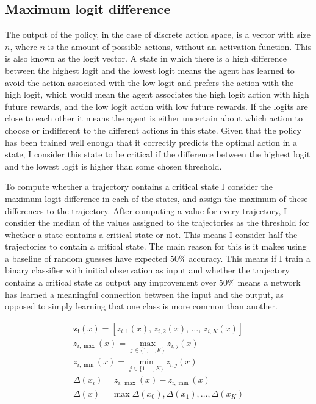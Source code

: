 \documentclass[UKenglish]{uiomasterthesis}
\begin{document}
\subsection{Maximum logit difference}
\label{sec:mld}
The output of the policy, in the case of discrete action space, is a vector with size $n$, where $n$ is the amount of possible actions, without an activation function. This is also known as the logit vector. A state in which there is a high difference between the highest logit and the lowest logit means the agent has learned to avoid the action associated with the low logit and prefers the action with the high logit, which would mean the agent associates the high logit action with high future rewards, and the low logit action with low future rewards. If the logits are close to each other it means the agent is either uncertain about which action to choose or indifferent to the different actions in this state. Given that the policy has been trained well enough that it correctly predicts the optimal action in a state, I consider this state to be critical if the difference between the highest logit and the lowest logit is higher than some chosen threshold.

To compute whether a trajectory contains a critical state I consider the maximum logit difference in each of the states, and assign the maximum of these differences to the trajectory. After computing a value for every trajectory, I consider the median of the values assigned to the trajectories as the threshold for whether a state contains a critical state or not. This means I consider half the trajectories to contain a critical state. The main reason for this is it makes using a baseline of random guesses have expected $50\%$ accuracy. This means if I train a binary classifier with initial observation as input and whether the trajectory contains a critical state as output any improvement over $50\%$ means a network has learned a meaningful connection between the input and the output, as opposed to simply learning that one class is more common than another.

\begin{gather*}
    \mathbf{z_i}(x) = \left[z_{i,1}(x),\, z_{i,2}(x),\, \dots,\, z_{i,K}(x)\right]\\
    z_{i,\max}(x) = \max_{j \in \{1,\dots,K\}} z_{i,j}(x)\\
    z_{i,\min}(x) = \min_{j \in \{1,\dots,K\}} z_{i,j}(x)\\
\Delta(x_i) = z_{i,\max}(x) - z_{i,\min}(x)\\
\Delta(x) = \max{\Delta(x_0),\Delta(x_1), \dots, \Delta(x_K)}
\end{gather*}
\end{document}
